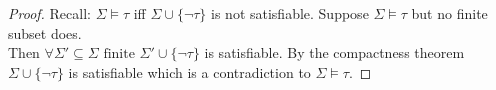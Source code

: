 \begin{proof}
    Recall: $\Sigma\models \tau$ iff $\Sigma\cup\{\lnot \tau\}$ is not satisfiable.
    Suppose $\Sigma\models \tau$ but no finite subset does. \\
    Then $\forall \Sigma'\subseteq \Sigma \text{ finite } \Sigma'\cup \{\lnot \tau\}$ is satisfiable.
    By the compactness theorem $\Sigma\cup \{\lnot \tau\}$ is satisfiable which is a contradiction to $\Sigma\models \tau$.
\end{proof}

